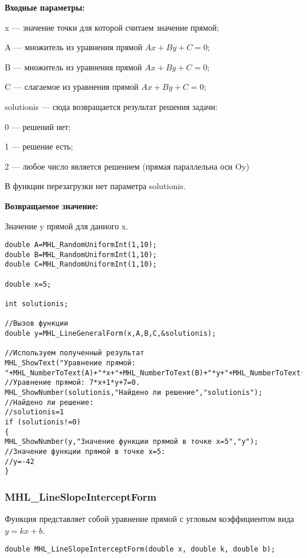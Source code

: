 \documentclass[a4paper,12pt]{article}
\begin{document}
\textbf{Входные параметры:}  
 
x --- значение точки для которой считаем значение прямой;
 
A --- множитель из уравнения прямой $Ax+By+C=0$;
 
B --- множитель из уравнения прямой $Ax+By+C=0$;
 
C --- слагаемое из уравнения прямой $Ax+By+C=0$;
 
solutionis --- сюда возвращается результат решения задачи:
 
 0 --- решений нет;
 
 1 --- решение есть;
 
 2 --- любое число является решением (прямая параллельна оси Oy)
 
 В функции перезагрузки нет параметра solutionis.

\textbf{Возвращаемое значение:}
 
Значение y прямой для данного x.


\begin{lstlisting}[label=code_use_MHL_LineGeneralForm,caption=Пример использования]
double A=MHL_RandomUniformInt(1,10);
double B=MHL_RandomUniformInt(1,10);
double C=MHL_RandomUniformInt(1,10);

double x=5;

int solutionis;

//Вызов функции
double y=MHL_LineGeneralForm(x,A,B,C,&solutionis);

//Используем полученный результат
MHL_ShowText("Уравнение прямой: "+MHL_NumberToText(A)+"*x+"+MHL_NumberToText(B)+"*y+"+MHL_NumberToText(C)+"=0");
//Уравнение прямой: 7*x+1*y+7=0.
MHL_ShowNumber(solutionis,"Найдено ли решение","solutionis");
//Найдено ли решение:
//solutionis=1
if (solutionis!=0)
{
MHL_ShowNumber(y,"Значение функции прямой в точке x=5","y");
//Значение функции прямой в точке x=5:
//y=-42
}
\end{lstlisting}

\subsubsection{MHL\_LineSlopeInterceptForm}\label{MHL_LineSlopeInterceptForm}

Функция представляет собой уравнение прямой с угловым коэффициентом вида $y=kx+b$.


\begin{lstlisting}[label=code_syntax_MHL_LineSlopeInterceptForm,caption=Синтаксис]
double MHL_LineSlopeInterceptForm(double x, double k, double b);
\end{lstlisting}
\end{document}
